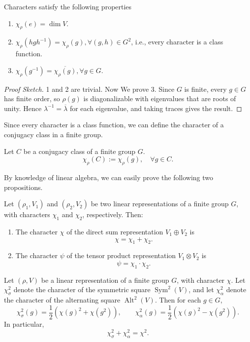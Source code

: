 \begin{prop}
\label{prop:linenear cha}
Characters satisfy the following properties
\begin{enumerate}
\item \(\chi_\rho(e) = \dim V\).
\item \(\chi_\rho(hgh^{-1}) = \chi_\rho(g),\forall (g,h)\in G^2\), i.e., every character is a class function.
\item \(\chi_\rho(g^{-1}) = \overline{\chi_\rho(g)},\forall g\in G\).
\end{enumerate}
\end{prop}
\begin{proof}[Proof Sketch]
1 and 2 are trivial. Now We prove 3. Since $G$ is finite, every \(g \in G\) has finite order, so \(\rho(g)\) is diagonalizable with eigenvalues that are roots of unity. Hence \(\lambda^{-1} = \overline{\lambda}\) for each eigenvalue, and taking traces gives the result.
\end{proof}
Since every character is a class function, we can define the character of a conjugacy class in a finite group.
\begin{notation}
Let $C$ be a conjugacy class of a finite group $G$. \[\chi_\rho(C)
:= \chi_\rho(g),\quad\forall g\in C.\]
\end{notation}

By knowledge of linear algebra, we can easily prove the following two propositions.

\begin{prop}
\label{prop:add_mul cha}
Let \((\rho_1,V_1)\) and \((\rho_2,V_2)\) be two linear representations of a finite group \(G\), with characters \(\chi_1\) and \(\chi_2\), respectively. Then:

\begin{enumerate}
    \item The character \(\chi\) of the direct sum representation \(V_1 \oplus V_2\) is
    \[
    \chi = \chi_1 + \chi_2.
    \]
    \item The character \(\psi\) of the tensor product representation \(V_1 \otimes V_2\) is
    \[
    \psi = \chi_1 \cdot \chi_2.
    \]
\end{enumerate}
\end{prop}
\begin{prop}\label{prop:sym_alt cha}
Let \((\rho,V)\) be a linear representation of a finite group \(G\), with character \(\chi\). Let \(\chi_\sigma^2\) denote the character of the symmetric square \(\operatorname{Sym}^2(V)\), and let \(\chi_\alpha^2\) denote the character of the alternating square \(\operatorname{Alt}^2(V)\). Then for each \(g \in G\),
\[
\chi_\sigma^2(g) = \frac{1}{2} \left( \chi(g)^2 + \chi(g^2) \right),
\qquad
\chi_\alpha^2(g) = \frac{1}{2} \left( \chi(g)^2 - \chi(g^2) \right).
\]
In particular,
\[
\chi_\sigma^2 + \chi_\alpha^2 = \chi^2.
\]
\end{prop}
